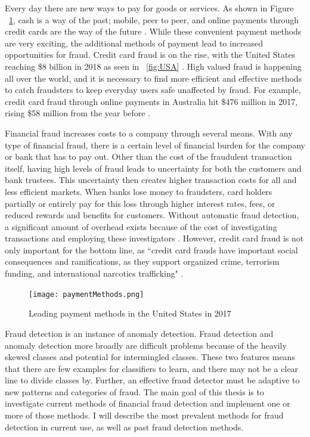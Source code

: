 \documentclass[midd]{thesis}
\begin{document}
Every day there are new ways to pay for goods or services. As shown in Figure ~\ref{fig:paymentMethods}, cash is a way of the past; mobile, peer to peer, and online payments through credit cards are the way of the future \cite{paymentMethods}. While these convenient payment methods are very exciting, the additional methods of payment lead to increased opportunities for fraud. Credit card fraud is on the rise, with the United States reaching \$8 billion in 2018 as seen in ~\ref{fig:USA}  \cite{USA}. High valued fraud is happening all over the world, and it is necessary to find more efficient and effective methods to catch fraudsters to keep everyday users safe unaffected by fraud. For example, credit card fraud through online payments in Australia hit \$476 million in 2017, rising \$58 million from the year before \cite{Wang2018}. 

Financial fraud increases costs to a company through several means. With any type of financial fraud, there is a certain level of financial burden for the company or bank that has to pay out. Other than the cost of the fraudulent transaction itself, having high levels of fraud leads to uncertainty for both the customers and bank trustees. This uncertainty then creates higher transaction costs for all and less efficient markets. When banks lose money to fraudsters, card holders partially or entirely pay for this loss through higher interest rates, fees, or reduced rewards and benefits for customers. Without automatic fraud detection, a significant amount of overhead exists because of the cost of investigating transactions and employing these investigators \cite{Chan}. However, credit card fraud is not only important for the bottom line, as ``credit card frauds have important social consequences and ramifications, as they support organized crime, terrorism funding, and international narcotics trafficking" \cite{Zanin2018}.

\begin{figure}
  \texttt{[image: paymentMethods.png]}
  \caption{Leading payment methods in the United States in 2017 \cite{paymentMethods}}
  \label{fig:paymentMethods}
\end{figure}

Fraud detection is an instance of anomaly detection. Fraud detection and anomaly detection more broadly are difficult problems because of the heavily skewed classes and potential for intermingled classes. These two features means that there are few examples for classifiers to learn, and there may not be a clear line to divide classes by. Further, an effective fraud detector must be adaptive to new patterns and categories of fraud. The main goal of this thesis is to investigate current methods of financial fraud detection and implement one or more of those methods. I will describe the most prevalent methods for fraud detection in current use, as well as past fraud detection methods.
\end{document}
